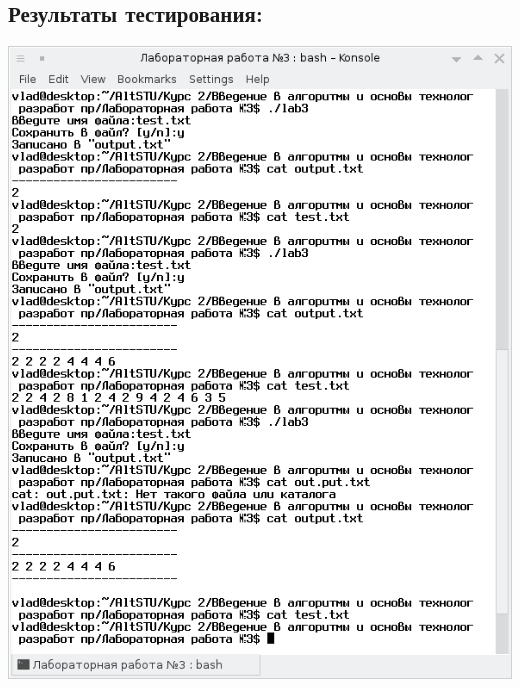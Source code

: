 \documentclass[a4paper,14pt]{extreport}
\begin{document}
\subsection*{Результаты тестирования:}
\begin{center}
	\includegraphics[scale = 1]{2.png}
\end{center}
\end{document}
